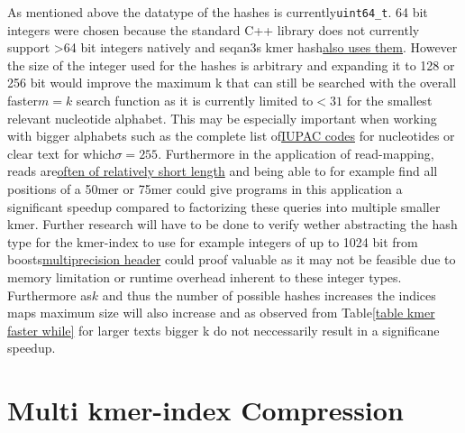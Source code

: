 As mentioned above the datatype of the hashes is currently\lstinline{uint64_t}.
64 bit integers were chosen because the standard C++ library does
not currently support >64 bit integers natively and seqan3s kmer hash\href{http://docs.seqan.de/seqan/3-master-user/group__views.html\#ga6e598d6a021868f704d39df73252974f}{also uses them}.
However the size of the integer used for the hashes is arbitrary and
expanding it to 128 or 256 bit would improve the maximum k that can
still be searched with the overall faster$m=k$ search function as
it is currently limited to$<31$ for the smallest relevant nucleotide
alphabet. This may be especially important when working with bigger
alphabets such as the complete list of\href{https://www.bioinformatics.org/sms/iupac.html}{IUPAC codes}
for nucleotides or clear text for which$\sigma=255$. Furthermore
in the application of read-mapping, reads are\href{https://www.illumina.com/science/technology/next-generation-sequencing/plan-experiments/read-length.html}{often of relatively short length}
and being able to for example find all positions of a 50mer or 75mer
could give programs in this application a significant speedup compared
to factorizing these queries into multiple smaller kmer. Further research
will have to be done to verify wether abstracting the hash type for
the kmer-index to use for example integers of up to 1024 bit from
boosts\href{https://www.boost.org/doc/libs/1_62_0/libs/multiprecision/doc/html/boost_multiprecision/tut/ints/cpp_int.html}{multiprecision header}
could proof valuable as it may not be feasible due to memory limitation
or runtime overhead inherent to these integer types. Furthermore as$k$
and thus the number of possible hashes increases the indices maps
maximum size will also increase and as observed from Table\ref{table kmer faster while}
for larger texts bigger k do not neccessarily result in a significane
speedup.

\section{Multi kmer-index Compression}

